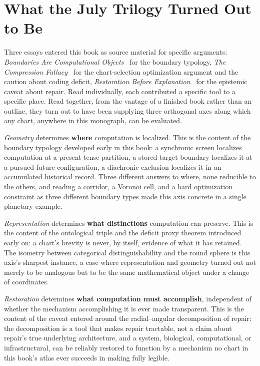 \documentclass[11pt,fleqn]{book}
\numberwithin{equation}{chapter}
\theoremstyle{plain}
\theoremstyle{definition}
\theoremstyle{remark}
\begin{document}
\section{What the July Trilogy Turned Out to Be}

Three essays entered this book as source material for specific arguments: \emph{Boundaries Are Computational Objects}~\cite{boundaries} for the boundary typology, \emph{The Compression Fallacy}~\cite{compression-fallacy} for the chart-selection optimization argument and the caution about coding deficit, \emph{Restoration Before Explanation}~\cite{restoration} for the epistemic caveat about repair. Read individually, each contributed a specific tool to a specific place. Read together, from the vantage of a finished book rather than an outline, they turn out to have been supplying three orthogonal axes along which any chart, anywhere in this monograph, can be evaluated.

\emph{Geometry} determines \textbf{where} computation is localized. This is the content of the boundary typology developed early in this book: a synchronic screen localizes computation at a present-tense partition, a stored-target boundary localizes it at a pursued future configuration, a diachronic exclusion localizes it in an accumulated historical record. Three different answers to where, none reducible to the others, and reading a corridor, a Voronoi cell, and a hard optimization constraint as three different boundary types made this axis concrete in a single planetary example.

\emph{Representation} determines \textbf{what distinctions} computation can preserve. This is the content of the ontological triple and the deficit proxy theorem introduced early on: a chart's brevity is never, by itself, evidence of what it has retained. The isometry between categorical distinguishability and the round sphere is this axis's sharpest instance, a case where representation and geometry turned out not merely to be analogous but to be the same mathematical object under a change of coordinates.

\emph{Restoration} determines \textbf{what computation must accomplish}, independent of whether the mechanism accomplishing it is ever made transparent. This is the content of the caveat entered around the radial--angular decomposition of repair: the decomposition is a tool that makes repair tractable, not a claim about repair's true underlying architecture, and a system, biological, computational, or infrastructural, can be reliably restored to function by a mechanism no chart in this book's atlas ever succeeds in making fully legible.
\end{document}
